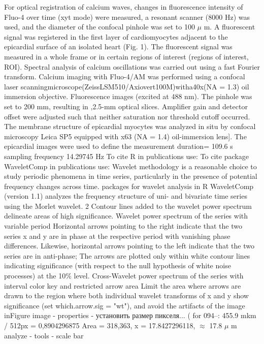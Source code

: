 \documentclass[a4paper,12pt]{article}
\begin{document}
For optical registration of calcium waves, changes in fluorescence intensity of Fluo-4 over time (xyt mode) were measured, a resonant scanner (8000 Hz) was used, and the diameter of the confocal pinhole was set to 100 $\mu$ m.
A fluorescent signal was registered in the first layer of cardiomyocytes adjacent to the epicardial surface of an isolated heart (Fig. 1). The fluorescent signal was measured in a whole frame or in certain regions of interest (regions of interest, ROI).
Spectral analysis of calcium oscillations was carried out using a fast Fourier transform.
Calcium imaging with Fluo-4/AM was performed using a confocal laser scanningmicroscope(ZeissLSM510/Axiovert100M)witha40x(NA = 1.3) oil immersion objective. Fluorescence images (excited at 488 nm).
The pinhole was set to 200 mm, resulting in ,2.5-mm optical slices. Amplifier gain and detector offset were adjusted such that neither saturation nor threshold cutoff occurred.
The membrane structure of epicardial myocytes was analyzed in situ by confocal microscopy Leica SP5 equipped with x63 (NA = 1.4) oil-immersion lens]. The epicardial images were used to define the
measurement duration= 109.6 s
sampling frequency 14.29745 Hz
To cite R in publications use:  \cite{team2014r}
To cite package WaveletComp in publications use: \cite{roesch2014waveletcomp}
Wavelet methodology is a reasonable choice to study periodic phenomena in time series, particularly in
the presence of potential frequency changes across time.
packages for wavelet analysis in R
WaveletComp (version 1.1) analyzes the frequency structure of uni- and bivariate time series using the Morlet wavelet. 2
Contour lines added to the wavelet power spectrum delineate areas of high significance.
Wavelet power spectrum of the series with variable period
Horizontal arrows pointing to the right indicate that the two series x and y are in phase at the respective period with vanishing phase differences.
Likewise, horizontal arrows pointing to the left indicate that the two series are in anti-phase;
The arrows are plotted only within white contour lines indicating significance (with respect to the null hypothesis of white noise processes) at the 10\% level.
Cross-Wavelet power spectrum of the series with interval color key and restricted arrow area
Limit the area where arrows are drawn to the region where both individual wavelet transforms of x and y show significance (set which.arrow.sig = "wt"), and avoid the artifacts of the image inFigure
image - properties - установить размер пикселя...
( for 094--: 455.9 mkm / 512px = 0,8904296875
Area = 318,363, x = 17.8427296118, $\approx$ 17.8 $\mu$ m
analyze - tools - scale bar
\end{document}
